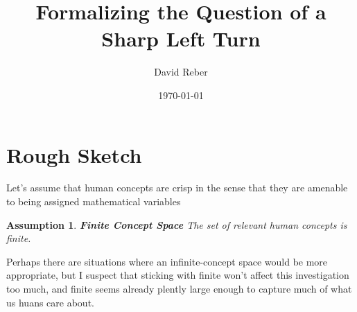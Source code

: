 \documentclass{article}
\title{Formalizing the Question of a Sharp Left Turn}
\author{David Reber}
\date{\today}
\newtheorem{assumption}{Assumption}
\begin{document}
\maketitle




\section*{Rough Sketch}

Let's assume that human concepts are crisp in the sense that they are amenable to being assigned mathematical variables
\begin{assumption}{\textbf{Finite Concept Space}}
    The set of relevant human concepts is finite.
\end{assumption}
Perhaps there are situations where an infinite-concept space would be more appropriate, but I suspect that sticking with finite won't affect this investigation too much, and finite seems already plently large enough to capture much of what us huans care about.
\end{document}
